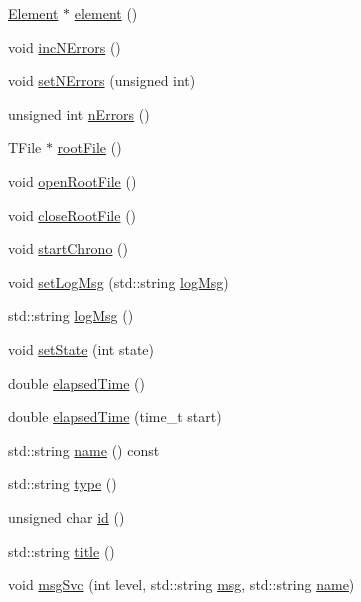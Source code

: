 \begin{DoxyCompactItemize}
\hyperlink{classElement}{Element} $\ast$ \hyperlink{classProcessus_a6fe155527431a7190b7d44d600b9608d}{element} ()
\item 
void \hyperlink{classProcessus_abe603d0636f76db6aa6c5c60cf34c591}{inc\+N\+Errors} ()
\item 
void \hyperlink{classProcessus_a831b027b9cf18ab56fa6147b5d3055da}{set\+N\+Errors} (unsigned int)
\item 
unsigned int \hyperlink{classProcessus_a82a0487f82f07cc2c2dc2731f98149e7}{n\+Errors} ()
\item 
T\+File $\ast$ \hyperlink{classProcessus_a247e8c362ec08422cf53d08dd23b093c}{root\+File} ()
\item 
void \hyperlink{classProcessus_aacf6812880c1d1a2bf14a4a39458f443}{open\+Root\+File} ()
\item 
void \hyperlink{classProcessus_a2f3c41e99da4c738ea3d8f7b0d20a665}{close\+Root\+File} ()
\item 
void \hyperlink{classProcessus_a5e4d34b86241fa0756e07375a14ff4b2}{start\+Chrono} ()
\item 
void \hyperlink{classProcessus_a471833f89047aa9a7ff6200a31c17a1d}{set\+Log\+Msg} (std\+::string \hyperlink{classProcessus_a42fdeb17dc13ba854222666b6aa29b61}{log\+Msg})
\item 
std\+::string \hyperlink{classProcessus_a42fdeb17dc13ba854222666b6aa29b61}{log\+Msg} ()
\item 
void \hyperlink{classProcessus_ad38cde0f1bcefa00b068e7947b8af927}{set\+State} (int state)
\item 
double \hyperlink{classProcessus_aecca96218c65bc805c988cd95447df55}{elapsed\+Time} ()
\item 
double \hyperlink{classProcessus_a06d3815ad56593dfd0d3c1f534f8b146}{elapsed\+Time} (time\+\_\+t start)
\item 
std\+::string \hyperlink{classObject_a300f4c05dd468c7bb8b3c968868443c1}{name} () const
\item 
std\+::string \hyperlink{classObject_a84f99f70f144a83e1582d1d0f84e4e62}{type} ()
\item 
unsigned char \hyperlink{classObject_af99145335cc61ff6e2798ea17db009d2}{id} ()
\item 
std\+::string \hyperlink{classObject_a73a0f1a41828fdd8303dd662446fb6c3}{title} ()
\item 
void \hyperlink{classObject_a3f9d5537ebce0c0f2bf6ae4d92426f3c}{msg\+Svc} (int level, std\+::string \hyperlink{classObject_a58b2d0618c2d08cf2383012611528d97}{msg}, std\+::string \hyperlink{classObject_a300f4c05dd468c7bb8b3c968868443c1}{name})

\end{DoxyCompactItemize}
